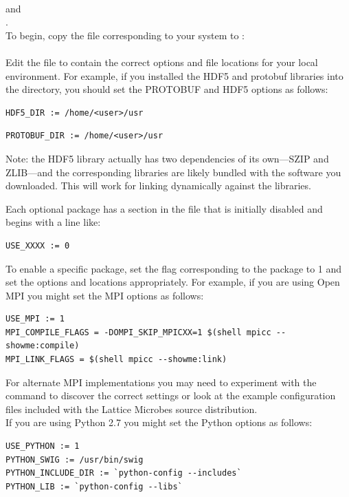 \\
and\\
.\\

To begin, copy the file corresponding to your system to :\\

\\

Edit the  file to contain the correct options and file locations for your local environment. For example, if you installed the HDF5 and protobuf libraries into the  directory, you should set the PROTOBUF and HDF5 options as follows:

{\small\begin{verbatim}
HDF5_DIR := /home/<user>/usr
\end{verbatim}}
{\small\begin{verbatim}
PROTOBUF_DIR := /home/<user>/usr
\end{verbatim}}

Note: the HDF5 library actually has two dependencies of its own---SZIP and ZLIB---and the corresponding libraries are likely bundled with the software you downloaded.  This will work for linking dynamically against the libraries.

Each optional package has a section in the  file that is initially disabled and begins with a line like:
{\small\begin{verbatim}
USE_XXXX := 0
\end{verbatim}}

To enable a specific package, set the flag corresponding to the package to 1 and set the options and locations appropriately. For example, if you are using Open MPI you might set the MPI options as follows:
{\small\begin{verbatim}
USE_MPI := 1
MPI_COMPILE_FLAGS = -DOMPI_SKIP_MPICXX=1 $(shell mpicc --showme:compile)
MPI_LINK_FLAGS = $(shell mpicc --showme:link)
\end{verbatim}}

For alternate MPI implementations you may need to experiment with the  command to discover the correct settings or look at the example configuration files included with the Lattice Microbes source distribution.\\

If you are using Python 2.7 you might set the Python options as follows:
{\small\begin{verbatim}
USE_PYTHON := 1
PYTHON_SWIG := /usr/bin/swig
PYTHON_INCLUDE_DIR := `python-config --includes`
PYTHON_LIB := `python-config --libs`
\end{verbatim}}

